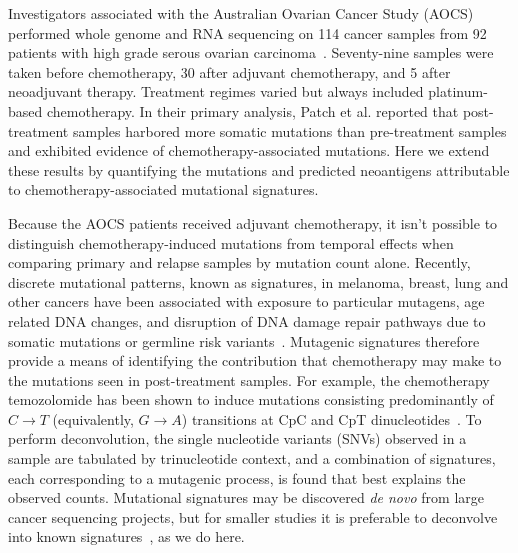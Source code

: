Investigators associated with the Australian Ovarian Cancer Study (AOCS) performed whole genome and RNA sequencing on 114 cancer samples from 92 patients with high grade serous ovarian carcinoma~\cite{Patch_2015}. Seventy-nine samples were taken before chemotherapy, 30 after adjuvant chemotherapy, and 5 after neoadjuvant therapy. Treatment regimes varied but always included platinum-based chemotherapy. In their primary analysis, Patch et al. reported that post-treatment samples harbored more somatic mutations than pre-treatment samples and exhibited evidence of chemotherapy-associated mutations. Here we extend these results by quantifying the mutations and predicted neoantigens attributable to chemotherapy-associated mutational signatures.

Because the AOCS patients received adjuvant chemotherapy, it isn't possible to distinguish chemotherapy-induced mutations from temporal effects when comparing primary and relapse samples by mutation count alone. Recently, discrete mutational patterns, known as signatures, in melanoma, breast, lung and other cancers have been associated with exposure to particular mutagens, age related DNA changes, and disruption of DNA damage repair pathways due to somatic mutations or germline risk variants~\cite{Alexandrov2013}. Mutagenic signatures therefore provide a means of identifying the contribution that chemotherapy may make to the mutations seen in post-treatment samples. For example, the chemotherapy temozolomide has been shown to induce mutations consisting predominantly of $C \rightarrow T$ (equivalently, $G \rightarrow A$) transitions at CpC and CpT dinucleotides~\cite{Johnson_2013}. To perform deconvolution, the single nucleotide variants (SNVs) observed in a sample are tabulated by trinucleotide context, and a combination of signatures, each corresponding to a mutagenic process, is found that best explains the observed counts. Mutational signatures may be discovered \textit{de novo} from large cancer sequencing projects, but for smaller studies it is preferable to deconvolve into known signatures~\cite{Rosenthal_2016}, as we do here.


